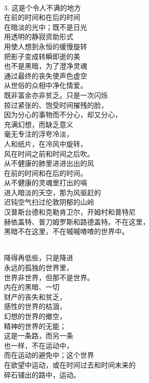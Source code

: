\documentclass{article}
\begin{document}
 \\
3. 这是个令人不满的地方\\
在前的时间和在后的时间\\
在暗淡的光中；既不是日光\\
用透明的静寂资助形式\\
用使人想到永恒的缓慢旋转\\
把影子变成转瞬即逝的美\\
也不是黑暗，为了澄净灵魂\\
通过最终的丧失使声色虚空\\
从世俗的众相中净化情爱。\\
既非富余亦非贫乏。只是一次闪烁\\
掠过紧张的、饱受时间摧残的脸，\\
因为分心的事物而不分心，却又分心，\\
充满幻想，而缺乏意义\\
毫无专注的浮夸冷淡，\\
人和纸片，在冷风中旋转，\\
风在时间之前和时间之后吹。\\
从不健康的肺里进进出出的风\\
在前的时间和在后的时间。
\newpage
\\
从不健康的灵魂里打出的嗝\\
进入暗淡的天空，那为风驱赶的\\
迟钝空气扫过伦敦阴郁的山岭\\
汉普斯台德和克勒肯卫尔，开姆村和普特尼\\
赫依盖特、普刀姆罗斯和路德盖特。不在这里，\\
黑暗不在这里，不在嘁嘁喳喳的世界中。 

 \\
降得再低些，只是降进\\
永远的孤独的世界里，\\
世界非世界，但那不是世界。\\
内在的黑暗、一切\\
财产的丧失和贫乏，\\
感性的世界的枯涸，\\
幻想的世界的撤空，\\
精神的世界的无能；\\
这是一条路，而另一条\\
也一样，不在运动中，\\
而在运动的避免中；这个世界\\
在欲望中运动，或在时间过去和时间未来的\\
碎石铺出的路中，运动。 
\end{document}
